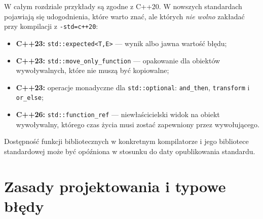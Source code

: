 W całym rozdziale przykłady są zgodne z C++20. W nowszych standardach
pojawiają się udogodnienia, które warto znać, ale których \emph{nie wolno}
zakładać przy kompilacji z \texttt{-std=c++20}:
\begin{itemize}
\item \textbf{C++23:} \texttt{std::expected<T,E>} --- wynik albo
      jawna wartość błędu;
\item \textbf{C++23:} \texttt{std::move\_only\_function} --- opakowanie
      dla obiektów wywoływalnych, które nie muszą być kopiowalne;
\item \textbf{C++23:} operacje monadyczne dla \texttt{std::optional}:
      \texttt{and\_then}, \texttt{transform} i \texttt{or\_else};
\item \textbf{C++26:} \texttt{std::function\_ref} --- niewłaścicielski
      widok na obiekt wywoływalny, którego czas życia musi zostać
      zapewniony przez wywołującego.
\end{itemize}

Dostępność funkcji bibliotecznych w konkretnym kompilatorze i jego
bibliotece standardowej może być opóźniona w stosunku do daty
opublikowania standardu.

\section{Zasady projektowania i typowe błędy}
\label{sec:cpp14-guidelines}

